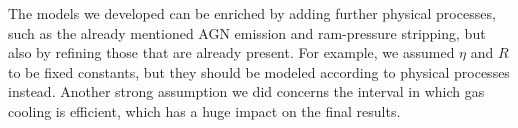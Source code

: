 \documentclass[fleqn,usenatbib]{mnras}
\begin{document}
The models we developed can be enriched by adding further physical processes, such as the already mentioned AGN emission and ram-pressure stripping, but also by refining those that are already present. For example, we assumed $\eta$ and $R$ to be fixed constants, but they should be modeled according to physical processes instead. Another strong assumption we did concerns the interval in which gas cooling is efficient, which has a huge impact on the final results.





 


\label{lastpage}
\end{document}

